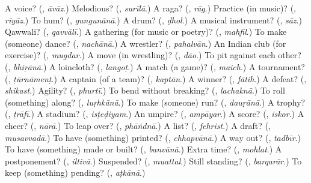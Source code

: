\begin{tcolorbox}[breakable,colback=teal!4,colframe=teal!35!black,title={Before you move on}]
A voice? (\textbf{}, \emph{āvāz}.) Melodious? (\textbf{}, \emph{surīlā}.) A raga? (\textbf{}, \emph{rāg}.) Practice (in music)? (\textbf{}, \emph{riyāz}.) To hum? (\textbf{}, \emph{gungunānā}.) A drum? (\textbf{}, \emph{ḍhol}.) A musical instrument? (\textbf{}, \emph{sāz}.) Qawwali? (\textbf{}, \emph{qavvālī}.) A gathering (for music or poetry)? (\textbf{}, \emph{mahfil}.) To make (someone) dance? (\textbf{}, \emph{nachānā}.) A wrestler? (\textbf{}, \emph{pahalvān}.) An Indian club (for exercise)? (\textbf{}, \emph{mugdar}.) A move (in wrestling)? (\textbf{}, \emph{dāo}.) To pit against each other? (\textbf{}, \emph{bhiṛānā}.) A loincloth? (\textbf{}, \emph{langoṭ}.) A match (a game)? (\textbf{}, \emph{maich}.) A tournament? (\textbf{}, \emph{ṭūrnāmenṭ}.) A captain (of a team)? (\textbf{}, \emph{kaptān}.) A winner? (\textbf{}, \emph{fātih}.) A defeat? (\textbf{}, \emph{shikast}.) Agility? (\textbf{}, \emph{phurtī}.) To bend without breaking? (\textbf{}, \emph{lachaknā}.) To roll (something) along? (\textbf{}, \emph{luṛhkānā}.) To make (someone) run? (\textbf{}, \emph{dauṛānā}.) A trophy? (\textbf{}, \emph{ṭrāfī}.) A stadium? (\textbf{}, \emph{isṭeḍiyam}.) An umpire? (\textbf{}, \emph{ampāyar}.) A score? (\textbf{}, \emph{iskor}.) A cheer? (\textbf{}, \emph{nārā}.) To leap over? (\textbf{}, \emph{phāṅdnā}.) A list? (\textbf{}, \emph{fehrist}.) A draft? (\textbf{}, \emph{musavvadā}.) To have (something) printed? (\textbf{}, \emph{chhapvānā}.) A way out? (\textbf{}, \emph{tadbīr}.) To have (something) made or built? (\textbf{}, \emph{banvānā}.) Extra time? (\textbf{}, \emph{mohlat}.) A postponement? (\textbf{}, \emph{iltivā}.) Suspended? (\textbf{}, \emph{muattal}.) Still standing? (\textbf{}, \emph{barqarār}.) To keep (something) pending? (\textbf{}, \emph{aṭkānā}.)
\end{tcolorbox}
